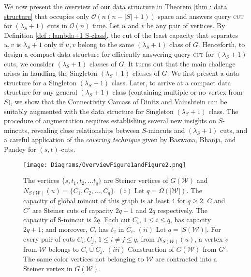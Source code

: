 \documentclass[letterpaper,11pt]{article}
\begin{document}
We now present the overview of our data structure in Theorem \ref{thm : data structure} that occupies only ${\mathcal O}(n(n-|S|+1))$ space and answers query \textsc{cut} for $(\lambda_S+1)$ cuts in ${\mathcal O}(n)$ time. Let $u$ and $v$ be any pair of vertices. By Definition \ref{def : lambda+1 S-class}, the cut of the least capacity that separates $u,v$ is $\lambda_S+1$ only if $u,v$ belong to the same $(\lambda_S+1)$ class of $G$.
Henceforth, to design a compact data structure for efficiently answering query \textsc{cut} for $(\lambda_S+1)$ cuts, we consider $(\lambda_S+1)$ classes of $G$. It turns out that the main challenge arises in handling the Singleton $(\lambda_S+1)$ classes of $G$. We first present a data structure for a Singleton $(\lambda_S+1)$ class. Later, to arrive at a compact data structure for any general $(\lambda_S+1)$ class (containing multiple or no vertex from $S$), we show that the Connectivity Carcass of Dinitz and Vainshtein \cite{DBLP:conf/stoc/DinitzV94, DBLP:conf/soda/DinitzV95, DBLP:journals/siamcomp/DinitzV00} can be suitably augmented with the data structure for Singleton $(\lambda_S+1)$ class. The procedure of augmentation requires establishing several new insights on $S$-mincuts, revealing close relationships between $S$-mincuts and $(\lambda_S+1)$ cuts, and a careful application of the \textit{covering technique} given by Baswana, Bhanja, and Pandey \cite{DBLP:journals/talg/BaswanaBP23} for $(s,t)$-cuts. 

\begin{figure}
 \centering
    \texttt{[image: Diagrams/OverviewFigure1andFigure2.png]} 
   \caption{The vertices 
   $\{s,t_1,t_2,\ldots t_q\}$ are Steiner vertices of $G({\mathcal W})$ and  $N_{S({\mathcal W})}(u)=\{C_1,C_2,\ldots, C_q\}$. $(i)$ Let $q=\Omega(|{\mathcal W}|)$. The capacity of global mincut of this graph is at least $4$ for $q\ge 2$. $C$ and $C'$ are Steiner cuts of capacity $2q+1$ and $2q$ respectively. The capacity of S-mincut is $2q$. Each cut $C_i$, $1\le i\le q$, has capacity $2q+1$; and moreover, $C_i$ has $t_2$ in $\overline{C_i}$. $(ii)$ Let $q=|S({\mathcal W})|$. For every pair of cuts $C_i,C_j$, $1\le i\ne j\le q$, from $N_{S({\mathcal W})}(u)$, a vertex $v$ from ${\mathcal W}$ belongs to $\overline{C_i\cup C_j}$. $(iii)$ Construction of $G({\mathcal W})$ from $G'$. The same color vertices not belonging to ${\mathcal W}$ are contracted into a Steiner vertex in $G({\mathcal W})$.}
  \label{fig : 1st figure in overview}
\end{figure}
\end{document}
